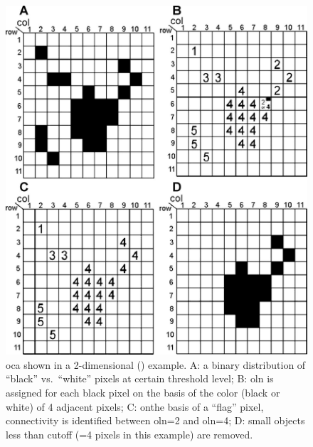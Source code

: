 \begin{figure}[p]
	\centering
	\includegraphics[width=\imsize]{img/Tsuda2008/Tsuda-03}
	\caption[Object connectivity analysis]{\acf{oca} shown in a 2-dimensional (\twod) example. A: a binary distribution of ``black'' vs.\ ``white'' pixels at certain threshold level; B: \acf{oln} is assigned for each black pixel on the basis of the color (black or white) of 4 adjacent pixels; C: onthe basis of a ``flag'' pixel, connectivity is identified between \ac{oln}=2 and \ac{oln}=4; D: small objects
less than cutoff (=4 pixels in this example) are removed.}
	\label{fig:oca}
\end{figure}

